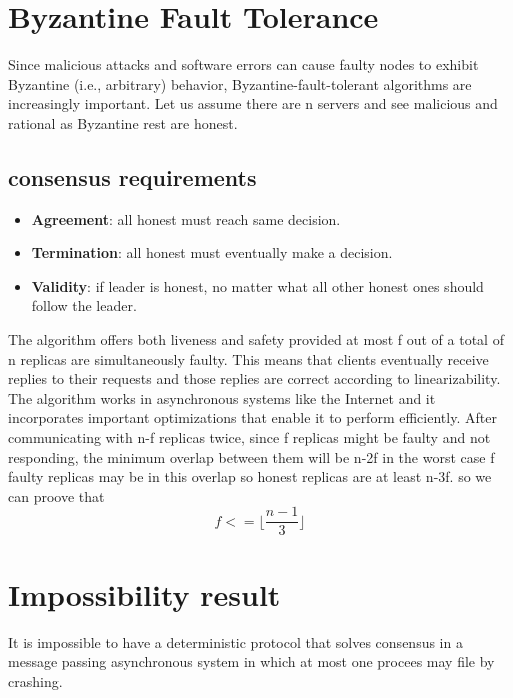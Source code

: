 \documentclass{article}
\begin{document}
\section{Byzantine Fault Tolerance}
Since malicious attacks and software errors can cause faulty nodes to exhibit Byzantine (i.e., arbitrary) behavior, Byzantine-fault-tolerant algorithms are increasingly important.
Let us assume there are n servers and see malicious and rational 
as Byzantine rest are honest.
\subsection{consensus requirements}
\begin{itemize}
    \item \textbf{Agreement}: all honest must reach same decision.
    \item \textbf{Termination}: all honest must eventually make a decision.
    \item \textbf{Validity}: if leader is honest, no matter what all other honest ones should follow the leader.
\end{itemize}
The algorithm offers both liveness and safety
provided at most f out of a total of n replicas are simultaneously faulty. This means that clients eventually receive replies to their requests and those replies are correct according to linearizability. The algorithm works in asynchronous systems like the Internet and it
incorporates important optimizations that enable it to
perform efficiently. 
After communicating with n-f replicas twice, since f replicas might be faulty and not responding, the minimum overlap between 
them will be n-2f in the worst case f faulty replicas may be in this overlap so honest replicas are at least n-3f. so we can proove that 
$$ f <= \lfloor \frac{n -1 }{3} \rfloor$$
\section{Impossibility result}
It is impossible to have a deterministic protocol that solves consensus in a message passing asynchronous system in which at most one procees may file by crashing.
\end{document}

